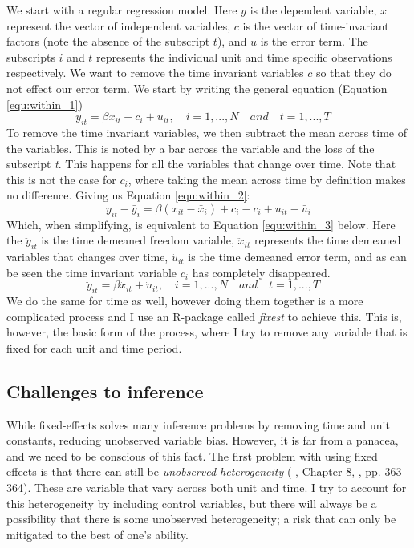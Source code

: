 We start with a regular regression model. Here $y$ is the dependent variable, $x$ represent the vector of independent variables, $c$ is the vector of time-invariant factors (note the absence of the subscript $t$), and $u$ is the error term. The subscripts $i$ and $t$ represents the individual unit and time specific observations respectively. We want to remove the time invariant variables $c$ so that they do not effect our error term. We start by writing the general equation (Equation \ref{equ:within_1})
\begin{equation}
    y_{it} = \beta x_{it} + c_i + u_{it}, \quad i = 1,..., N \quad and \quad  t = 1,..., T  \quad
\label{equ:within_1}
\end{equation} 
To remove the time invariant variables, we then subtract the mean across time of the variables. This is noted by a bar across the variable and the loss of the subscript \textit{t}. This happens for all the variables that change over time. Note that this is not the case for $c_i$, where taking the mean across time by definition makes no difference. Giving us Equation \ref{equ:within_2}:
\begin{equation}
    y_{it} - \bar{y}_i = \beta (x_{it} - \bar{x}_i) + c_i - c_i + u_{it} - \bar{u}_i
\label{equ:within_2}
\end{equation}
Which, when simplifying, is equivalent to Equation \ref{equ:within_3} below. Here the $\ddot{y}_{it}$ is the time demeaned freedom variable, $\ddot{x}_{it}$ represents the time demeaned variables that changes over time, $\ddot{u}_{it}$ is the time demeaned error term, and as can be seen the time invariant variable $c_i$ has completely disappeared. 
\begin{equation}
    \ddot{y}_{it} = \beta \ddot{x}_{it} + \ddot{u}_{it}, \quad i = 1,..., N \quad and \quad  t = 1,..., T  \quad 
\label{equ:within_3}
\end{equation}
We do the same for time as well, however doing them together is a more complicated process and I use an R-package called \textit{fixest} \citep{berge_efficient_2018} to achieve this. This is, however, the basic form of the process, where I try to remove any variable that is fixed for each unit and time period.

\subsection{Challenges to inference}
While fixed-effects solves many inference problems by removing time and unit constants, reducing unobserved variable bias. However, it is far from a panacea, and we need to be conscious of this fact. The first problem with using fixed effects is that there can still be \textit{unobserved heterogeneity} (\citeauthor{cunningham_causal_2021} \citeyear{cunningham_causal_2021}, Chapter 8, \citeauthor{hill_limitations_2020} \citeyear{hill_limitations_2020}, pp. 363-364). These are variable that vary across both unit and time. I try to account for this heterogeneity by including control variables, but there will always be a possibility that there is some unobserved heterogeneity; a risk that can only be mitigated to the best of one's ability.

